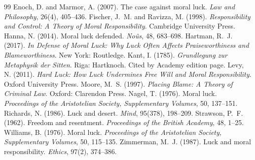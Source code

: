 \documentclass{situationist-preprint}
\begin{document}
\begin{thebibliography}{99}\small
{} Enoch, D. and Marmor, A. (2007). The case against moral luck. \emph{Law and Philosophy}, 26(4), 405--436.
 Fischer, J.~M. and Ravizza, M. (1998). \emph{Responsibility and Control: A Theory of Moral Responsibility}. Cambridge University Press.
 Hanna, N. (2014). Moral luck defended. \emph{No\^{u}s}, 48, 683--698.
 Hartman, R.~J. (2017). \emph{In Defense of Moral Luck: Why Luck Often Affects Praiseworthiness and Blameworthiness}. New York: Routledge.
 Kant, I. (1785). \emph{Grundlegung zur Metaphysik der Sitten}. Riga: Hartknoch. Cited by Academy edition page.
 Levy, N. (2011). \emph{Hard Luck: How Luck Undermines Free Will and Moral Responsibility}. Oxford University Press.
 Moore, M.~S. (1997). \emph{Placing Blame: A Theory of Criminal Law}. Oxford: Clarendon Press.
 Nagel, T. (1976). Moral luck. \emph{Proceedings of the Aristotelian Society, Supplementary Volumes}, 50, 137--151.
 Richards, N. (1986). Luck and desert. \emph{Mind}, 95(378), 198--209.
 Strawson, P.~F. (1962). Freedom and resentment. \emph{Proceedings of the British Academy}, 48, 1--25.
 Williams, B. (1976). Moral luck. \emph{Proceedings of the Aristotelian Society, Supplementary Volumes}, 50, 115--135.
 Zimmerman, M.~J. (1987). Luck and moral responsibility. \emph{Ethics}, 97(2), 374--386.
\end{thebibliography}
\end{document}
